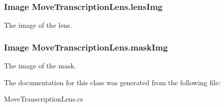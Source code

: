 \subsubsection[{lens\+Img}]{\setlength{\rightskip}{0pt plus 5cm}Image Move\+Transcription\+Lens.\+lens\+Img}\label{class_move_transcription_lens_a5866efc3b483fb9ffe6143687db88718}


The image of the lens. 

\subsubsection[{mask\+Img}]{\setlength{\rightskip}{0pt plus 5cm}Image Move\+Transcription\+Lens.\+mask\+Img}\label{class_move_transcription_lens_aa6cfdf5315d72486178bc311132e8363}


The image of the mask. 



The documentation for this class was generated from the following file\+:\begin{DoxyCompactItemize}
\item 
Move\+Transcription\+Lens.\+cs\end{DoxyCompactItemize}
